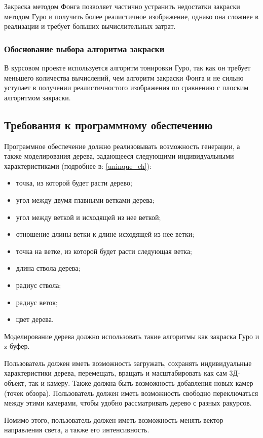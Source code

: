 \documentclass[54pt, a4paper]{article}
\begin{document}
	Закраска методом Фонга позволяет частично устранить недостатки закраски
	методом Гуро и получить более реалистичное изображение, однако она сложнее в
	реализации и требует больших вычислительных затрат.
	
	\subsubsection{Обоснование выбора алгоритма закраски}
	В курсовом проекте используется алгоритм тонировки Гуро, так как он требует меньшего количества вычислений, чем алгоритм закраски Фонга и не сильно уступает в получении реалистичностого изображения по сравнению с плоским алгоритмом закраски.
	
	\subsection{Требования к программному обеспечению}
	Программное обеспечение должно реализовывать возможность генерации, а также моделирования дерева, задающееся следующими индивидуальными характеристиками (подробнее в: \ref{uninque_ch}):
	\begin{itemize}
		\item точка, из которой будет расти дерево;
		\item угол между двумя главными ветками дерева;
		\item угол между веткой и исходящей из нее веткой;
		\item отношение длины ветки к длине исходящей из нее ветки;
		\item точка на ветке, из которой будет расти следующая ветка;
		\item длина ствола дерева;
		\item радиус ствола;
		\item радиус веток;
		\item цвет дерева.
	\end{itemize}
	
	Моделирование дерева должно использовать такие алгоритмы как закраска Гуро и z-буфер.
	
	Пользователь должен иметь возможность загружать, сохранять индивидуальные характеристики дерева, перемещать, вращать и масштабировать как сам 3Д-объект, так и камеру. Также должна быть возможность добавления новых камер (точек обзора). Пользователь должен иметь возможность свободно переключаться между этими камерами, чтобы удобно рассматривать дерево с разных ракурсов.
	
	Помимо этого, пользователь должен иметь возможность менять вектор направления света, а также его интенсивность.
	
\end{document}
